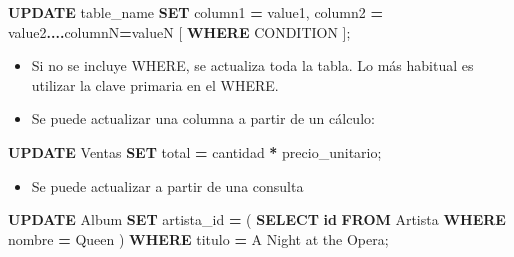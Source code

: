 \documentclass[
]{book}
\newenvironment{Shaded}{\begin{snugshade}}{\end{snugshade}}
\newcommand{\KeywordTok}[1]{\textcolor[rgb]{0.13,0.29,0.53}{\textbf{#1}}}
\newcommand{\NormalTok}[1]{#1}
\newcommand{\OperatorTok}[1]{\textcolor[rgb]{0.81,0.36,0.00}{\textbf{#1}}}
\newcommand{\StringTok}[1]{\textcolor[rgb]{0.31,0.60,0.02}{#1}}
\providecommand{\tightlist}{%
  \setlength{\itemsep}{0pt}\setlength{\parskip}{0pt}}
\theoremstyle{break}
\theoremstyle{nonumberplain}
\begin{document}
\begin{Shaded}
\begin{Highlighting}[]
\KeywordTok{UPDATE}\NormalTok{ table\_name}
\KeywordTok{SET}\NormalTok{ column1 }\OperatorTok{=}\NormalTok{ value1, column2 }\OperatorTok{=}\NormalTok{ value2}\OperatorTok{....}\NormalTok{columnN}\OperatorTok{=}\NormalTok{valueN}
\NormalTok{[ }\KeywordTok{WHERE}\NormalTok{  CONDITION ];}
\end{Highlighting}
\end{Shaded}

\begin{itemize}
\item
  Si no se incluye WHERE, se actualiza toda la tabla. Lo más habitual es utilizar la clave primaria en el WHERE.
\item
  Se puede actualizar una columna a partir de un cálculo:
\end{itemize}

\begin{Shaded}
\begin{Highlighting}[]
\KeywordTok{UPDATE}\NormalTok{ Ventas}
\KeywordTok{SET}\NormalTok{ total }\OperatorTok{=}\NormalTok{ cantidad }\OperatorTok{*}\NormalTok{ precio\_unitario;}
\end{Highlighting}
\end{Shaded}

\begin{itemize}
\tightlist
\item
  Se puede actualizar a partir de una consulta
\end{itemize}

\begin{Shaded}
\begin{Highlighting}[]
\KeywordTok{UPDATE}\NormalTok{ Album}
\KeywordTok{SET}\NormalTok{ artista\_id }\OperatorTok{=}\NormalTok{ (}
    \KeywordTok{SELECT} \KeywordTok{id} \KeywordTok{FROM}\NormalTok{ Artista }\KeywordTok{WHERE}\NormalTok{ nombre }\OperatorTok{=} \StringTok{\textquotesingle{}Queen\textquotesingle{}}
\NormalTok{  )}
\KeywordTok{WHERE}\NormalTok{ titulo }\OperatorTok{=} \StringTok{\textquotesingle{}A Night at the Opera\textquotesingle{}}\NormalTok{;}
\end{Highlighting}
\end{Shaded}
\end{document}
